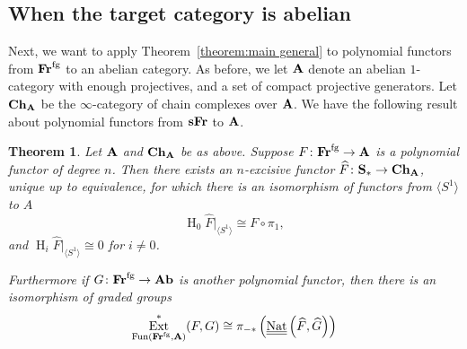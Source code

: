 \documentclass[psamsfonts]{amsart}
\theoremstyle{plain}
\newtheorem{thm}{Theorem}[section]
\theoremstyle{definition}
\theoremstyle{remark}
\newcommand{\catname}[1]{{\normalfont\textbf{#1}}}
\newcommand{\circles}{\langle S^1 \rangle}
\newcommand{\spaces}{\catname{S}_*}
\newcommand{\fr}{\allfr^{\mathrm{fg}}}
\newcommand{\allfr}{\catname{Fr}}
\newcommand{\sfr}{\catname{sFr}}
\newcommand{\ab}{\catname{Ab}}
\newcommand{\ch}{\catname{Ch}}
\newcommand{\HH}{\operatorname{H}} %
\DeclareMathOperator{\ext}{Ext}
\DeclareMathOperator{\nat}{Nat}
\DeclareMathOperator{\spectralNat}{\underline{\underline{\nat}}}
\DeclareMathOperator{\fun}{Fun}
\begin{document}
\subsection*{When the target category is abelian}
Next, we want to apply Theorem~\ref{theorem:main general} to polynomial functors from $\fr$ to an abelian category. As before, we let $\catname{A}$ denote an abelian $1$-category with enough projectives, and a set of compact projective generators. Let $\ch_{\catname{A}}$ be the $\infty$-category of chain complexes over $\catname{A}$.
We have the following result about polynomial functors from $\sfr$ to $\catname A$.
\begin{thm}\label{thm:fr-to-top}
Let $\catname{A}$ and $\ch_{\catname{A}}$ be as above. Suppose $F\colon \fr\to \catname{A}$ is a polynomial functor of degree $n$. Then there exists an $n$-excisive functor $\widehat F\colon \spaces\to \ch_{\catname{A}}$, unique up to equivalence, for which there is an isomorphism of functors from $\circles$ to $A$
\[
\HH_0\widehat F|_{\circles} \cong F\circ \pi_1,
\]
and $\HH_i \widehat F|_{\circles} \cong 0$ for $i\ne 0$. 

Furthermore if $G\colon \fr \to \ab$ is another polynomial functor, then there is an isomorphism of graded groups
\[
\ext^*_{\fun(\fr, \catname{A})}(F, G)\cong \pi_{-*}\left(\spectralNat\left(\widehat F, \widehat G\right)\right)
\]
\end{thm}
\end{document}
